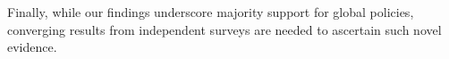 Finally, while our findings underscore majority support for global policies, converging results from independent surveys are needed to ascertain such novel evidence.
